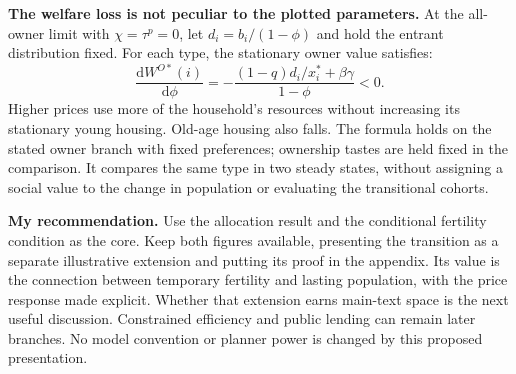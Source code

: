 \documentclass[11pt]{article}
\newcommand{\dd}{\mathrm d}
\begin{document}
\textbf{The welfare loss is not peculiar to the plotted parameters.}
At the all-owner limit with $\chi=\tau^p=0$, let $d_i=b_i/(1-\phi)$ and
hold the entrant distribution fixed. For each type, the stationary owner value
satisfies:
\begin{equation}
 \frac{\dd W^{O*}(i)}{\dd\phi}
 =-\frac{(1-q)d_i/x_i^*+\beta\gamma}{1-\phi}<0.
 \label{eq:core_stationary_welfare}
\end{equation}
Higher prices use more of the household's resources without increasing its
stationary young housing. Old-age housing also falls. The formula holds on
the stated owner branch with fixed preferences; ownership tastes are held
fixed in the comparison. It compares the same type in two steady states,
without assigning a social value to the change in population or evaluating
the transitional cohorts.

\textbf{My recommendation.} Use the allocation result and the conditional
fertility condition as the core. Keep both figures available, presenting the
transition as a separate illustrative extension and putting its proof in the
appendix. Its value is the connection between temporary fertility and lasting
population, with the price response made explicit. Whether that extension
earns main-text space is the next useful discussion. Constrained efficiency
and public lending can remain later branches. No model convention or planner
power is changed by this proposed presentation.
\end{document}
